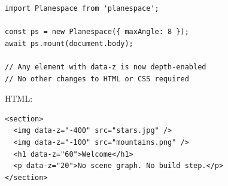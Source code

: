 \documentclass[10pt,twocolumn]{article}
\begin{document}
\begin{lstlisting}[style=js,caption={Complete Planespace integration in 5 lines.}]
import Planespace from 'planespace';

const ps = new Planespace({ maxAngle: 8 });
await ps.mount(document.body);

// Any element with data-z is now depth-enabled
// No other changes to HTML or CSS required
\end{lstlisting}

HTML:
\begin{lstlisting}[style=js,caption={HTML depth annotations.}]
<section>
  <img data-z="-400" src="stars.jpg" />
  <img data-z="-100" src="mountains.png" />
  <h1 data-z="60">Welcome</h1>
  <p data-z="20">No scene graph. No build step.</p>
</section>
\end{lstlisting}
\end{document}
